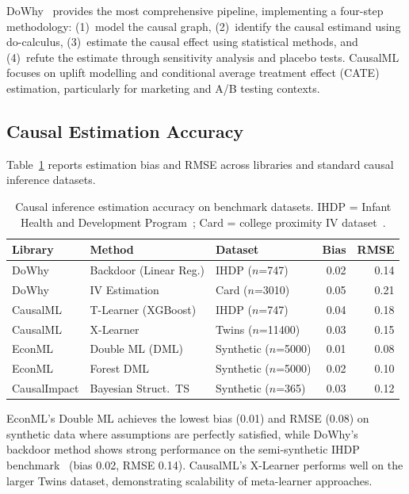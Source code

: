 \documentclass[12pt, a4paper]{article}
\begin{document}
DoWhy~\citep{sharma2020dowhy} provides the most comprehensive pipeline, implementing a four-step methodology: (1)~model the causal graph, (2)~identify the causal estimand using do-calculus, (3)~estimate the causal effect using statistical methods, and (4)~refute the estimate through sensitivity analysis and placebo tests. CausalML~\citep{chen2020causalml} focuses on uplift modelling and conditional average treatment effect (CATE) estimation, particularly for marketing and A/B testing contexts.

\subsection{Causal Estimation Accuracy}
Table~\ref{tab:causal-benchmarks} reports estimation bias and RMSE across libraries and standard causal inference datasets.

\begin{table}[ht]
\centering
\caption{Causal inference estimation accuracy on benchmark datasets. IHDP = Infant Health and Development Program~\citep{hill2011ihdp}; Card = college proximity IV dataset~\citep{card1995college}.}
\label{tab:causal-benchmarks}
\begin{tabular}{lllrr}
\toprule
\textbf{Library} & \textbf{Method} & \textbf{Dataset} & \textbf{Bias} & \textbf{RMSE} \\
\midrule
DoWhy    & Backdoor (Linear Reg.)  & IHDP ($n$=747)       & 0.02 & 0.14 \\
DoWhy    & IV Estimation           & Card ($n$=3010)      & 0.05 & 0.21 \\
CausalML & T-Learner (XGBoost)     & IHDP ($n$=747)       & 0.04 & 0.18 \\
CausalML & X-Learner               & Twins ($n$=11400)    & 0.03 & 0.15 \\
EconML   & Double ML (DML)         & Synthetic ($n$=5000) & 0.01 & 0.08 \\
EconML   & Forest DML              & Synthetic ($n$=5000) & 0.02 & 0.10 \\
CausalImpact & Bayesian Struct.~TS & Synthetic ($n$=365)  & 0.03 & 0.12 \\
\bottomrule
\end{tabular}
\end{table}

EconML's Double ML achieves the lowest bias (0.01) and RMSE (0.08) on synthetic data where assumptions are perfectly satisfied, while DoWhy's backdoor method shows strong performance on the semi-synthetic IHDP benchmark~\citep{hill2011ihdp} (bias 0.02, RMSE 0.14). CausalML's X-Learner performs well on the larger Twins dataset, demonstrating scalability of meta-learner approaches.
\end{document}
